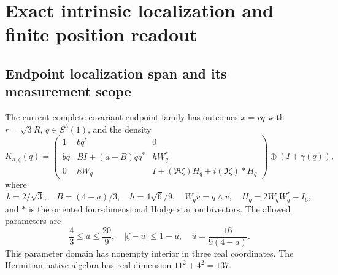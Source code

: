 \documentclass[12pt,a4paper]{article}
\begin{document}
\section{Exact intrinsic localization and finite position readout}
\subsection{Endpoint localization span and its measurement scope}
\label{p2c:sec:v226-family}

The current complete covariant endpoint family has outcomes $x=rq$ with
$r=\sqrt3R$, $q\in S^3(1)$, and the density
\begin{equation}\label{p2c:eq:v226-K}
 K_{a,\zeta}(q)=
 \begin{pmatrix}
 1&bq^*&0\\
 bq&B I+(a-B)qq^*&hW_q^*\\
 0&hW_q&I+(\Re\zeta)H_q+i(\Im\zeta)*H_q
 \end{pmatrix}\oplus(I+\gamma(q)),
\end{equation}
where
\[
 b=2/\sqrt3,\quad B=(4-a)/3,\quad h=4\sqrt6/9,
 \quad W_qv=q\wedge v,\quad H_q=2W_qW_q^*-I_6,
\]
and $*$ is the oriented four-dimensional Hodge star on bivectors. The
allowed parameters are
\[
 \frac43\le a\le\frac{20}{9},\quad
 |\zeta-u|\le1-u,\quad u=\frac{16}{9(4-a)}.
\]
This parameter domain has nonempty interior in three real coordinates.
The Hermitian native algebra has real dimension $11^2+4^2=137$.
\end{document}

